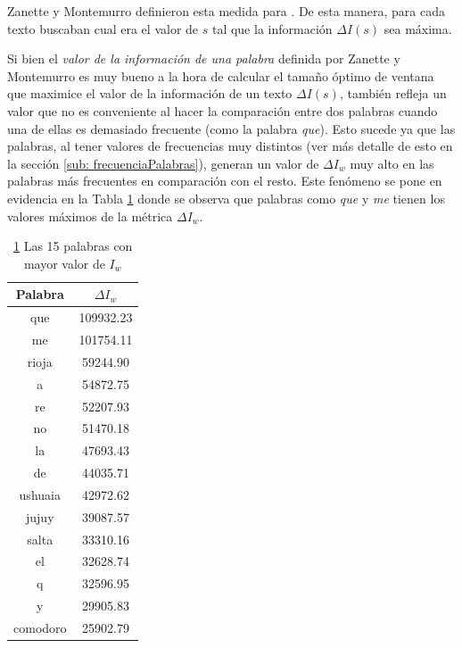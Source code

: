 Zanette y Montemurro definieron esta medida para . De esta manera, para cada texto buscaban cual era el valor de $s$ tal que la información $\Delta I(s)$ sea máxima.


Si bien el \textit{valor de la información de una palabra} definida por Zanette y Montemurro es muy bueno a la hora de calcular el tamaño óptimo de ventana que maximice el valor de la información de un texto $\Delta I(s)$, también refleja un valor que no es conveniente al hacer la comparación entre dos palabras cuando una de ellas es demasiado frecuente (como la palabra \textit{que}). Esto sucede ya que las palabras, al tener valores de frecuencias muy distintos (ver más detalle de esto en la sección \ref{sub: frecuenciaPalabras}), generan un valor de $\Delta I_w$ muy alto en las palabras más frecuentes en comparación con el resto. Este fenómeno se pone en evidencia en la Tabla \ref{tab:zanette} donde se observa que palabras como \textit{que} y \textit{me} tienen los valores máximos de la métrica $\Delta I_w$.



\begin{table}[h]
\centering

\begin{tabular}{ c c }
\toprule
Palabra  & $\Delta I_w$                      \\
\midrule
que      & 109932.23                         \\
me       & 101754.11                        \\
rioja    & 59244.90                          \\
a        & 54872.75                          \\
re       & 52207.93                          \\
no       & 51470.18                          \\
la       & 47693.43                          \\
de       & 44035.71                          \\
ushuaia  & 42972.62                          \\
jujuy    & 39087.57                          \\
salta    & 33310.16                          \\
el       & 32628.74                          \\
q        & 32596.95                          \\
y        & 29905.83                          \\
comodoro & 25902.79                         \\
\bottomrule
\end{tabular}
\caption{\ref{tab:zanette} Las 15 palabras con mayor valor de $I_w$ }
\label{tab:zanette}
\end{table}

